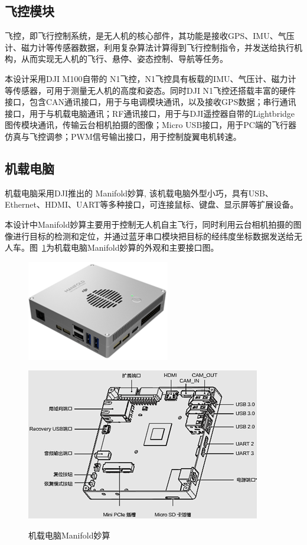 \subsection{飞控模块}
飞控，即飞行控制系统，是无人机的核心部件，其功能是接收GPS、IMU、气压计、磁力计等传感器数据，利用复杂算法计算得到飞行控制指令，并发送给执行机构，从而实现无人机的飞行、悬停、姿态控制、导航等任务。

本设计采用DJI M100自带的 N1飞控，N1飞控具有板载的IMU、气压计、磁力计等传感器，可用于测量无人机的高度和姿态。同时DJI N1飞控还搭载丰富的硬件接口，包含CAN通讯接口，用于与电调模块通讯，以及接收GPS数据；串行通讯接口，用于与机载电脑通讯；RF通讯接口，用于与DJI遥控器自带的Lightbridge图传模块通讯，传输云台相机拍摄的图像；Micro USB接口，用于PC端的飞行器仿真与飞控调参；PWM信号输出接口，用于控制旋翼电机转速。

\subsection{机载电脑}
机载电脑采用DJI推出的 Manifold妙算, 该机载电脑外型小巧，具有USB、Ethernet、HDMI、UART等多种接口，可连接鼠标、键盘、显示屏等扩展设备。

本设计中Manifold妙算主要用于控制无人机自主飞行，同时利用云台相机拍摄的图像进行目标的检测和定位，并通过蓝牙串口模块把目标的经纬度坐标数据发送给无人车。图~\ref{fig:2-3}为机载电脑Manifold妙算的外观和主要接口图。

\begin{figure}[htb]
	\begin{minipage}[t]{\linewidth}
		\centering
		\includegraphics[width=0.5\columnwidth]{figures/2-3a.png} 
		\label{fig:2-3a} 
	\end{minipage}
	\begin{minipage}[t]{\linewidth} 
		\centering
		\includegraphics[width=0.8\columnwidth]{figures/2-3b.png} 
		\label{fig:2-3b} 
	\end{minipage}
	\caption{机载电脑Manifold妙算}
	\label{fig:2-3}
\end{figure}

